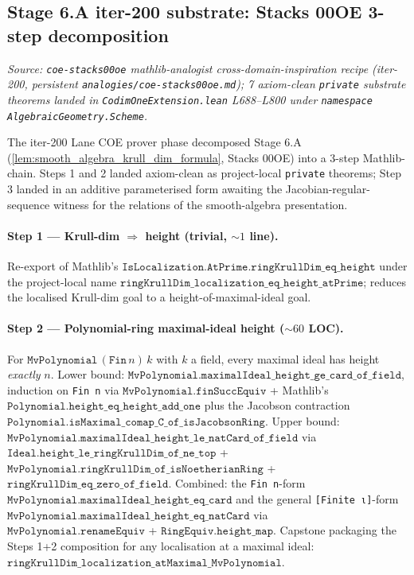 \subsection{Stage 6.A iter-200 substrate: Stacks 00OE 3-step decomposition}
\label{subsec:stage6_iib_substrate_iter200}
\textit{Source: \texttt{coe-stacks00oe} mathlib-analogist
cross-domain-inspiration recipe (iter-200, persistent
\texttt{analogies/coe-stacks00oe.md}); 7 axiom-clean
\texttt{private} substrate theorems landed in
\texttt{CodimOneExtension.lean} L688--L800 under
\texttt{namespace AlgebraicGeometry.Scheme}.}

The iter-200 Lane COE prover phase decomposed Stage 6.A
(\ref{lem:smooth_algebra_krull_dim_formula}, Stacks 00OE) into a
3-step Mathlib-chain. Steps 1 and 2 landed axiom-clean as
project-local \texttt{private} theorems; Step 3 landed in an
additive parameterised form awaiting the Jacobian-regular-sequence
witness for the relations of the smooth-algebra presentation.

\paragraph{Step 1 --- Krull-dim \(\Rightarrow\) height (trivial,
\(\sim 1\) line).} Re-export of Mathlib's
\(\texttt{IsLocalization.AtPrime.ringKrullDim\_eq\_height}\) under
the project-local name
\(\texttt{ringKrullDim\_localization\_eq\_height\_atPrime}\); reduces
the localised Krull-dim goal to a height-of-maximal-ideal goal.

\paragraph{Step 2 --- Polynomial-ring maximal-ideal height
(\(\sim 60\) LOC).} For \(\texttt{MvPolynomial}\,(\texttt{Fin}\,n)\,k\)
with \(k\) a field, every maximal ideal has height \emph{exactly}
\(n\). Lower bound:
\(\texttt{MvPolynomial.maximalIdeal\_height\_ge\_card\_of\_field}\),
induction on \texttt{Fin n} via \(\texttt{MvPolynomial.finSuccEquiv}\)
+ Mathlib's \(\texttt{Polynomial.height\_eq\_height\_add\_one}\) plus
the Jacobson contraction
\(\texttt{Polynomial.isMaximal\_comap\_C\_of\_isJacobsonRing}\). Upper
bound:
\(\texttt{MvPolynomial.maximalIdeal\_height\_le\_natCard\_of\_field}\)
via \(\texttt{Ideal.height\_le\_ringKrullDim\_of\_ne\_top}\) +
\(\texttt{MvPolynomial.ringKrullDim\_of\_isNoetherianRing}\) +
\(\texttt{ringKrullDim\_eq\_zero\_of\_field}\). Combined: the
\texttt{Fin n}-form
\(\texttt{MvPolynomial.maximalIdeal\_height\_eq\_card}\) and the
general \texttt{[Finite ι]}-form
\(\texttt{MvPolynomial.maximalIdeal\_height\_eq\_natCard}\) via
\(\texttt{MvPolynomial.renameEquiv}\) +
\(\texttt{RingEquiv.height\_map}\). Capstone packaging the
Steps 1+2 composition for any localisation at a maximal ideal:
\(\texttt{ringKrullDim\_localization\_atMaximal\_MvPolynomial}\).

